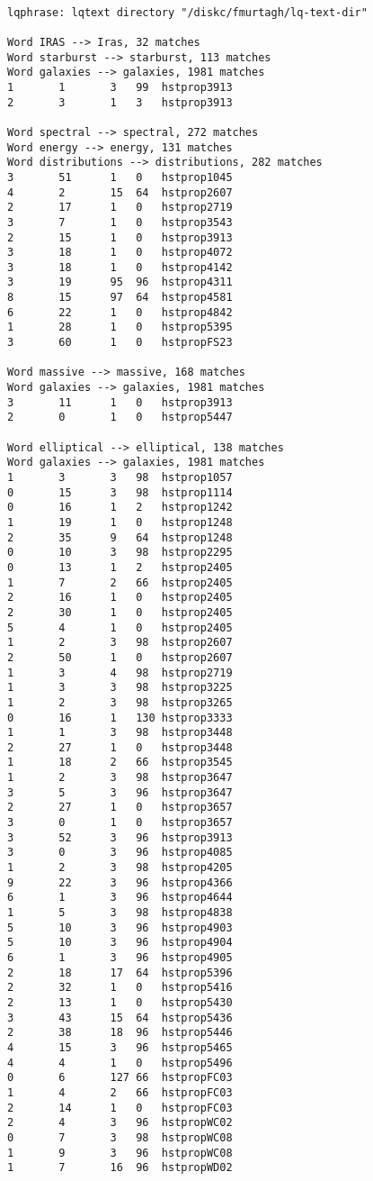 \begin{footnotesize}

\begin{verbatim}

lqphrase: lqtext directory "/diskc/fmurtagh/lq-text-dir"

Word IRAS --> Iras, 32 matches
Word starburst --> starburst, 113 matches
Word galaxies --> galaxies, 1981 matches
1       1       3   99  hstprop3913
2       3       1   3   hstprop3913

Word spectral --> spectral, 272 matches
Word energy --> energy, 131 matches
Word distributions --> distributions, 282 matches
3       51      1   0   hstprop1045
4       2       15  64  hstprop2607
2       17      1   0   hstprop2719
3       7       1   0   hstprop3543
2       15      1   0   hstprop3913
3       18      1   0   hstprop4072
3       18      1   0   hstprop4142
3       19      95  96  hstprop4311
8       15      97  64  hstprop4581
6       22      1   0   hstprop4842
1       28      1   0   hstprop5395
3       60      1   0   hstpropFS23

Word massive --> massive, 168 matches
Word galaxies --> galaxies, 1981 matches
3       11      1   0   hstprop3913
2       0       1   0   hstprop5447

Word elliptical --> elliptical, 138 matches
Word galaxies --> galaxies, 1981 matches
1       3       3   98  hstprop1057
0       15      3   98  hstprop1114
0       16      1   2   hstprop1242
1       19      1   0   hstprop1248
2       35      9   64  hstprop1248
0       10      3   98  hstprop2295
0       13      1   2   hstprop2405
1       7       2   66  hstprop2405
2       16      1   0   hstprop2405
2       30      1   0   hstprop2405
5       4       1   0   hstprop2405
1       2       3   98  hstprop2607
2       50      1   0   hstprop2607
1       3       4   98  hstprop2719
1       3       3   98  hstprop3225
1       2       3   98  hstprop3265
0       16      1   130 hstprop3333
1       1       3   98  hstprop3448
2       27      1   0   hstprop3448
1       18      2   66  hstprop3545
1       2       3   98  hstprop3647
3       5       3   96  hstprop3647
2       27      1   0   hstprop3657
3       0       1   0   hstprop3657
3       52      3   96  hstprop3913
3       0       3   96  hstprop4085
1       2       3   98  hstprop4205
9       22      3   96  hstprop4366
6       1       3   96  hstprop4644
1       5       3   98  hstprop4838
5       10      3   96  hstprop4903
5       10      3   96  hstprop4904
6       1       3   96  hstprop4905
2       18      17  64  hstprop5396
2       32      1   0   hstprop5416
2       13      1   0   hstprop5430
3       43      15  64  hstprop5436
2       38      18  96  hstprop5446
4       15      3   96  hstprop5465
4       4       1   0   hstprop5496
0       6       127 66  hstpropFC03
1       4       2   66  hstpropFC03
2       14      1   0   hstpropFC03
2       4       3   96  hstpropWC02
0       7       3   98  hstpropWC08
1       9       3   96  hstpropWC08
1       7       16  96  hstpropWD02


\end{verbatim}
\end{footnotesize}
